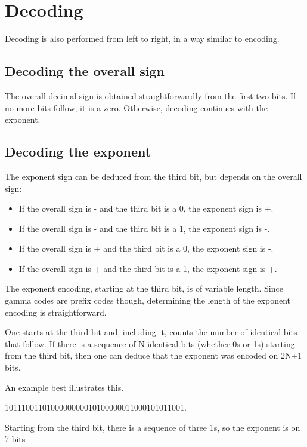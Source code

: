 \documentclass{acm_proc_article-sp}
\begin{document}
\section{Decoding}
\label{section-decoding}

Decoding is also performed from left to right, in a way similar to encoding.

\vspace{20pt}
\subsection{Decoding the overall sign}

The overall decimal sign is obtained straightforwardly from the first two bits. If no more bits follow, it is a zero. Otherwise, decoding continues with the exponent.

\subsection{Decoding the exponent}

The exponent sign can be deduced from the third bit, but depends on the overall sign:

\begin{itemize}
\item If the overall sign is - and the third bit is a 0, the exponent sign is +.
\item If the overall sign is - and the third bit is a 1, the exponent sign is -.
\item If the overall sign is + and the third bit is a 0, the exponent sign is -.
\item If the overall sign is + and the third bit is a 1, the exponent sign is +.
\end{itemize}

The exponent encoding, starting at the third bit, is of variable length. Since gamma codes are prefix codes though, determining the length of the exponent encoding is straightforward.

One starts at the third bit and, including it, counts the number of identical bits that follow. If there is a sequence of N identical bits (whether 0s or 1s) starting from the third bit, then one can deduce that the exponent was encoded on 2N+1 bits.

An example best illustrates this.

1011100110100000000010100000011000101011001.

Starting from the third bit, there is a sequence of three 1s, so the exponent is on 7 bits
\end{document}
